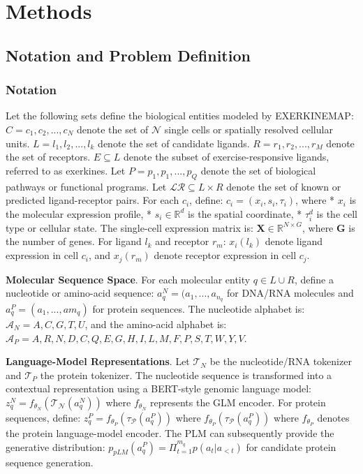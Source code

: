 \documentclass[11pt]{article}
\begin{document}
\section{Methods}

\subsection{Notation and Problem Definition}
\subsubsection{Notation}
Let the following sets define the biological entities modeled by EXERKINEMAP: $C = {c_1, c_2, ..., c_N}$ denote the set of $\mathcal{N}$ single cells or spatially resolved cellular units. $L={l_1,l_2,...,l_k}$ denote the set of candidate ligands. $R = {r_1,r_2,...,r_M}$ denote the set of receptors. $E \subseteq L$ denote the subset of exercise-responsive ligands, referred to as exerkines. Let $P = {p_1,p_1,...,p_Q}$ denote the set of biological pathways or functional programs. Let $\mathcal{LR}\subseteq L \times R$ denote the set of known or predicted ligand-receptor pairs. For each $c_i$, define: $c_i = (x_i,s_i,\tau_i)$,
where \newline
* $x_i$ is the molecular expression profile, \newline
* $s_i \in \mathbb{R}^d$ is the spatial coordinate, \newline
* $\tau_i^d$ is the cell type or cellular state. \newline
The single-cell expression matrix is: $\mathbf{X} \in \mathbb{R}^{N \times G}$, where $\mathbf{G}$ is the number of genes. For ligand $l_k$ and receptor $r_m$:
$x_i(l_k)$ denote ligand expression in cell $c_i$, and
$x_j(r_m)$ denote receptor expression in cell $c_j$.

\textbf{Molecular Sequence Space}. For each molecular entity $q \in L \cup R$, define a nucleotide or amino-acid sequence: $a_q^N = (a_1,...,a_{n_q}$ for DNA/RNA molecules and $a_q^P = (a_1,...,a{m_q})$ for protein sequences. The nucleotide alphabet is: $\mathcal{A}_N = {A,C,G,T,U}$, and the amino-acid alphabet is: $\mathcal{A}_P = {A,R,N,D,C,Q,E,G,H,I,L,M,F,P,S,T,W,Y,V}$.

\textbf{Language-Model Representations}. Let $\mathcal{T}_N$ be the nucleotide/RNA tokenizer and $\mathcal{T}_P$ the protein tokenizer. The nucleotide sequence is transformed into a contextual representation using a BERT-style genomic language model: $z_q^N = f_{\theta_N} (\mathcal{T_N}(a_q^N))$
where $f_{\theta_N}$ represents the GLM encoder. For protein sequences, define: $z_q^P = f_{\theta_P}(\mathcal{\tau_P}(a_q^P))$ where $f_{\theta_P}(\mathcal{\tau_P}(a_q^P))$ where $f_{\theta_P}$ denotes the protein language-model encoder. The PLM can subsequently provide the generative distribution: $p_{pLM}(a_q^P) = \Pi_{t=1}^{m_q}p(a_t|a_{<t})$ for candidate protein sequence generation.
\end{document}

